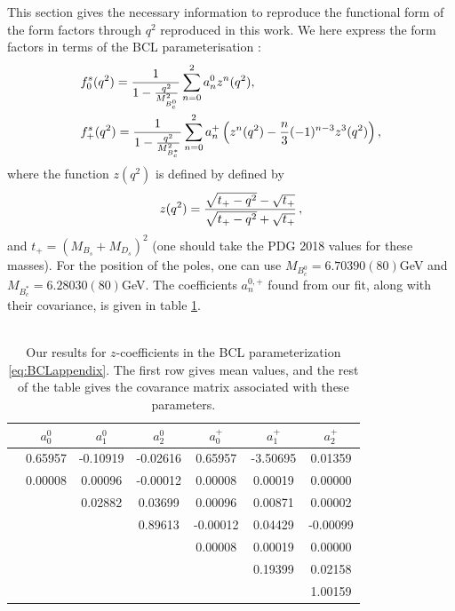 This section gives the necessary information to reproduce the functional form of the form factors through $q^2$ reproduced in this work. We here express the form factors in terms of the BCL parameterisation \cite{Bourrely:2008za}:
\begin{align}
  \label{eq:BCLappendix}
  &f^s_0(q^2) = {1\over 1 - {q^2\over M_{B_c^0}^2} } \sum_{n=0}^{2} a_n^0 z^n(q^2), \\
  \nonumber
  &f^s_+(q^2) = {1\over 1 - {q^2\over M_{B_c^*}^2} } \sum_{n=0}^{2} a_n^+ \left( z^n(q^2) - {n\over 3} (-1)^{n-3} z^3(q^2) \right), \nonumber
\end{align}
where the function $z(q^2)$ is defined by defined by
\begin{align}
  z(q^2) = {\sqrt{t_+ - q^2} - \sqrt{t_+} \over \sqrt{t_+ - q^2} + \sqrt{t_+} }\,,
\end{align}
and $t_+ = (M_{B_s}+M_{D_s})^2$ (one should take the PDG 2018 values for these masses). For the position of the poles, one can use $M_{B_c^0} = 6.70390(80)$GeV and $M_{B_c^*} = 6.28030(80)$GeV. The coefficients $a_n^{0,+}$ found from our fit, along with their covariance, is given in table \ref{tab:coeffs}. \\ \\

\begin{table}[htb!]
  \begin{center}
    \begin{tabular}{ c c c c c c c }
      \hline
      & $a^0_0$ & $a^0_1$ & $a^0_2$ & $a^+_0$ & $a^+_1$ & $a^+_2$\\ [0.5ex]
      \hline
      & 0.65957 & -0.10919 & -0.02616 & 0.65957 & -3.50695 & 0.01359\\ [1ex]
      \hline
      & 0.00008 & 0.00096 & -0.00012 & 0.00008 & 0.00019 & 0.00000\\ [1ex]
      &  & 0.02882 & 0.03699 & 0.00096 & 0.00871 & 0.00002\\ [1ex]
      &  &  & 0.89613 & -0.00012 & 0.04429 & -0.00099\\ [1ex]
      &  &  &  & 0.00008 & 0.00019 & 0.00000\\ [1ex]
      &  &  &  &  & 0.19399 & 0.02158\\ [1ex]
      &  &  &  &  &  & 1.00159\\ [1ex]
      \hline
    \end{tabular}
    \caption{Our results for $z$-coefficients in the BCL parameterization \eqref{eq:BCLappendix}. The first row gives mean values, and the rest of the table gives the covarance matrix associated with these parameters. \label{tab:coeffs}}
  \end{center}
\end{table}


